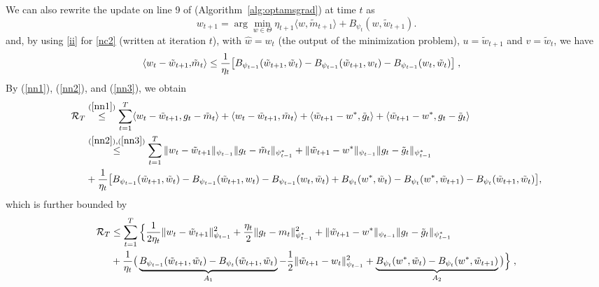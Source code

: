 \documentclass[11pt]{article}
\makeatletter
\renewenvironment{proof}[1][\proofname]{%
   \par\pushQED{\qed}\normalfont%
   \topsep6\p@\@plus6\p@\relax
   \trivlist\item[\hskip\labelsep\bfseries#1]%
   \ignorespaces
}{%
   \popQED\endtrivlist\@endpefalse
}
\theoremstyle{k}
\makeatother
\begin{document}
\begin{proof}
We can also rewrite the update on line 9 of (Algorithm~\ref{alg:optamsgrad}) at time $t$ as
\begin{equation} \label{nc2}
\textstyle w_{t+1} = \arg\min_{w \in \Theta} \eta_{t+1} \langle w, \tilde{m}_{t+1} \rangle + B_{\psi_t}(w, \tilde{w}_{t+1} ).
\end{equation}
and, by using \eqref{ii} for \eqref{nc2} (written at iteration $t$), with $\hat{w} = w_{t}$ (the output of the minimization problem), $u = \tilde{w}_{t+1}$ and $v = \tilde{w}_{t}$, we have
\begin{equation} \label{nn3}
\begin{aligned}
\langle w_t -\tilde{w}_{t+1}, & \tilde{m}_t  \rangle \leq \frac{1}{\eta_t}\big[ B_{\psi_{t-1}}(\tilde{w}_{t+1}, \tilde{w}_{t}) - B_{\psi_{t-1}}(\tilde{w}_{t+1}, w_t ) - B_{\psi_{t-1}}(w_{t}, \tilde{w}_{t}) \big] \;,
\end{aligned}
\end{equation}
By (\ref{nn1}), (\ref{nn2}), and (\ref{nn3}), we obtain
\begin{equation} \label{nnn}
\begin{aligned}
 \mathcal{R}_T & \overset{(\ref{nn1})}{\leq} \sum_{t=1}^T \langle  w_t - \tilde{w}_{t+1} , g_t - \tilde{m}_t \rangle + \langle w_t - \tilde{w}_{t+1}, \tilde{m}_t \rangle + \langle \tilde{w}_{t+1} - w^*, \tilde{g}_t  \rangle+ \langle \tilde{w}_{t+1} - w^*,g_t - \tilde{g}_t  \rangle \\
& \overset{(\ref{nn2}), (\ref{nn3})}{\leq}  \sum_{t=1}^T \| w_t - \tilde{w}_{t+1} \|_{\psi_{t-1}} \| g_t - \tilde{m}_t  \|_{\psi_{t-1}^*} + \|  \tilde{w}_{t+1} - w^* \|_{\psi_{t-1}} \| g_t - \tilde{g}_t  \|_{\psi_{t-1}^*}\\
&+ \frac{1}{\eta_t} \big[ B_{\psi_{t-1}}(\tilde{w}_{t+1}, \tilde{w}_{t}) - B_{\psi_{t-1}}(\tilde{w}_{t+1}, w_t ) - B_{\psi_{t-1}}(w_{t}, \tilde{w}_{t}) +  B_{\psi_t}( w^*, \tilde{w}_{t}) -B_{\psi_t}(w^*,  \tilde{w}_{t+1} ) - B_{\psi_t}(\tilde{w}_{t+1}, \tilde{w}_{t}) \big],
\end{aligned}
\end{equation}
which is further bounded by
\begin{equation} \label{nnnn}
\begin{aligned}
 \mathcal{R}_T & \leq \sum_{t=1}^T \Big\{ \frac{1}{2 \eta_t} \| w_t - \tilde{w}_{t+1} \|_{\psi_{t-1}}^2 + \frac{\eta_t}{2} \| g_t - m_t  \|_{\psi_{t-1}^*}^2+ \|  \tilde{w}_{t+1} - w^* \|_{\psi_{t-1}} \| g_t - \tilde{g}_t  \|_{\psi_{t-1}^*}\\\
 &  + \frac{1}{\eta_t} \big(\underbrace{B_{\psi_{t-1}}(\tilde{w}_{t+1}, \tilde{w}_{t}) - B_{\psi_t}(\tilde{w}_{t+1}, \tilde{w}_{t}) }_{A_1}- \frac{1}{2} \| \tilde{w}_{t+1} - w_t \|_{\psi_{t-1}}^2+\underbrace{B_{\psi_t}( w^*, \tilde{w}_{t}) -B_{\psi_t}(w^*,  \tilde{w}_{t+1} )}_{A_2}  \big) \Big\} \eqsp,

\end{aligned}
\end{equation}
\end{proof}
\end{document}
